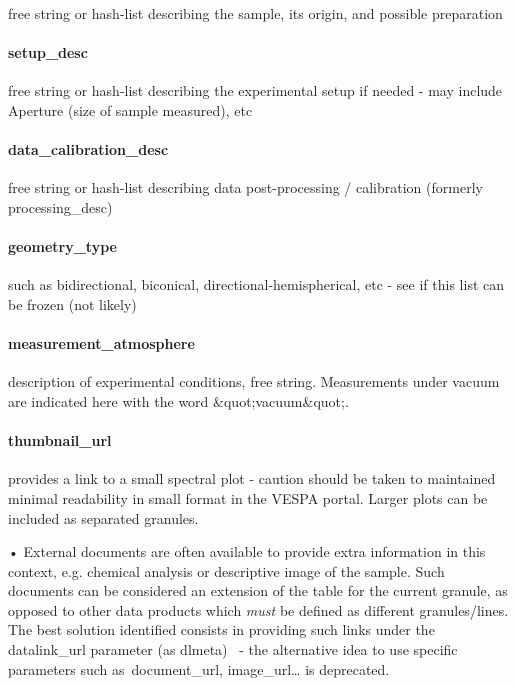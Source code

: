 \documentclass[11pt,a4paper]{ivoa}
\begin{document}
free string or hash-list describing the sample, its origin, and possible preparation

\paragraph{setup\_desc}

free string or hash-list describing the experimental setup if needed - may include Aperture (size of sample measured), etc

\paragraph{data\_calibration\_desc}

free string or hash-list describing data post-processing / calibration (formerly processing\_desc)

\paragraph{geometry\_type}

such as bidirectional, biconical, directional-hemispherical, etc - see if this list can be frozen (not likely)

\paragraph{measurement\_atmosphere}

description of experimental conditions, free string. Measurements under vacuum are indicated here with the word \&quot;vacuum\&quot;.

\paragraph{\textbf{thumbnail\_url}}

provides a link to a small spectral plot - caution should be taken to maintained minimal readability in small format in the VESPA portal. Larger plots can be included as separated granules.

• External documents are often available to provide extra information in this context, e.g. chemical analysis or descriptive image of the sample. Such documents can be considered an extension of the table for the current granule, as opposed to other data products which \emph{must} be defined as different granules/lines. The best solution identified consists in providing such links under the datalink\_url parameter (as dlmeta)  - the alternative idea to use specific parameters such as document\_url, image\_url… is deprecated.
\end{document}
